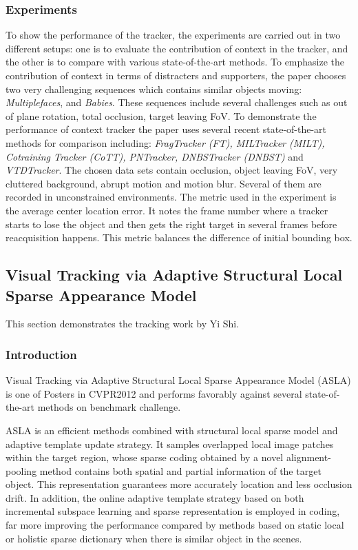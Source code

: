 \documentclass{acm_proc_article-sp}
\begin{document}
\subsubsection{Experiments}
    To show the performance of the tracker, the experiments are carried out in two different setups: one is to evaluate the contribution of context in the tracker, and the other is to compare with various state-of-the-art methods.
    \newline
    To emphasize the contribution of context in terms of distracters and supporters, the paper chooses two very challenging sequences which contains similar objects moving:  \textit{Multiplefaces}, and  \textit{Babies}. These sequences include several challenges such as out of plane rotation, total occlusion, target leaving FoV.
    \newline
    To demonstrate the performance of context tracker the paper uses several recent state-of-the-art methods for comparison including: \textit{FragTracker (FT), MILTracker (MILT), Cotraining Tracker (CoTT), PNTracker, DNBSTracker (DNBST)} and \textit{VTDTracker}. The chosen data sets contain occlusion, object leaving FoV, very cluttered background, abrupt motion and motion blur. Several of them are recorded in unconstrained environments. The metric used in the experiment is the average center location error. It notes the frame number where a tracker starts to lose the object and then gets the right target in several frames before reacquisition happens. This metric balances the difference of initial bounding box.


\subsection{Visual Tracking via Adaptive Structural Local Sparse Appearance Model}
This section demonstrates the tracking work by Yi Shi.

\subsubsection{Introduction}
Visual Tracking via Adaptive Structural Local Sparse Appearance Model (ASLA) is one of Posters in CVPR2012 and performs favorably against several state-of-the-art methods on benchmark challenge.

ASLA is an efficient methods combined with structural local sparse model and adaptive template update strategy. It samples overlapped local image patches within the target region, whose sparse coding obtained by a novel alignment-pooling method contains both spatial and partial information of the target object. This representation guarantees more accurately location and less occlusion drift. In addition, the online adaptive template strategy based on both incremental subspace learning and sparse representation is employed in coding, far more improving the performance compared by methods based on static local or holistic sparse dictionary when there is similar object in the scenes.
\end{document}
